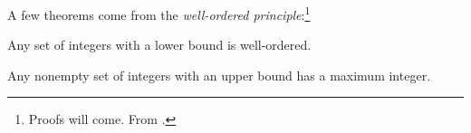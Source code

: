 A few theorems come from the \emph{well-ordered principle}:\footnote{Proofs will come. From \cite[29]{mcsfull}.}
\begin{theorem}
  Any set of integers with a lower bound is well-ordered.
\end{theorem}
\begin{theorem}
  Any nonempty set of integers with an upper bound has a maximum integer.
\end{theorem}
